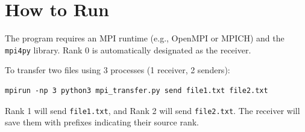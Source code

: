 \documentclass[11pt,a4paper]{article}
\begin{document}
\section{How to Run}
The program requires an MPI runtime (e.g., OpenMPI or MPICH) and the \texttt{mpi4py} library. Rank 0 is automatically designated as the receiver.

To transfer two files using 3 processes (1 receiver, 2 senders):
\begin{verbatim}
mpirun -np 3 python3 mpi_transfer.py send file1.txt file2.txt
\end{verbatim}

Rank 1 will send \texttt{file1.txt}, and Rank 2 will send \texttt{file2.txt}. The receiver will save them with prefixes indicating their source rank.
\end{document}
